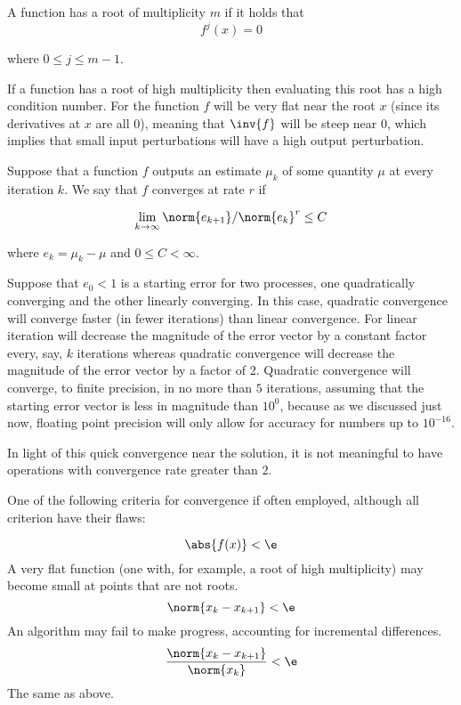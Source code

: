 \documentclass[../main.tex]{subfiles}
\begin{document}
    \begin{definition}
        A function has a root of multiplicity $m$ if it holds that
        \[
            f^{j}(x) = 0
        \]

        where $0 \leq j \leq m-1$.
    \end{definition}

    \begin{remark}
        If a function has a root of high multiplicity then evaluating this root has a high condition number. For the function $f$ will be very flat near the root $x$ (since its derivatives at $x$ are all $0$), meaning that $\inv{f}$ will be steep near $0$, which implies that small input perturbations will have a high output perturbation.
    \end{remark}
    \begin{definition}
        Suppose that a function $f$ outputs an estimate $\mu_k$ of some quantity $\mu$ at every iteration $k$. We say that $f$ converges at rate $r$ if

        \[
            \lim_{k \to \infty}\norm{e_{k+1}}/\norm{e_{k}}^r \leq C 
        \]

        where $e_{k} = \mu_k - \mu$ and $0 \leq C < \infty$.
    \end{definition}
    \begin{remark}
        Suppose that $e_0 < 1$ is a starting error for two processes, one quadratically converging and the other linearly converging. In this case, quadratic convergence will converge faster (in fewer iterations) than linear convergence. For linear iteration will decrease the magnitude of the error vector by a constant factor every, say, $k$ iterations whereas quadratic convergence will decrease the magnitude of the error vector by a factor of $2$.
        Quadratic convergence will converge, to finite precision, in no more than $5$ iterations, assuming that the starting error vector is less in magnitude than $10^{0}$, because as we discussed just now, floating point precision will only allow for accuracy for numbers up to $10^{-16}$.

        In light of this quick convergence near the solution, it is not meaningful to have operations with convergence rate greater than $2$.
    \end{remark}

    \begin{definition}
        One of the following criteria for convergence if often employed, although all criterion have their flaws:
        \begin{outline}
            \1 \[
                \abs{f(x)} < \e
            \]
            \2 A very flat function (one with, for example, a root of high multiplicity) may become small at points that are not roots.
            \1 \[
                \norm{x_{k} - x_{k+1}} < \e
            \]
            \2 An algorithm may fail to make progress, accounting for incremental differences.
            \1 \[
                \frac{\norm{x_{k} - x_{k+1}}}{\norm{x_k}} < \e
            \]
            \2 The same as above.
        \end{outline}
    \end{definition}
\end{document}

